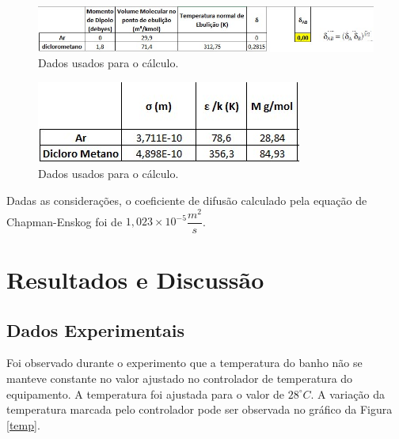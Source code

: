 \begin{figure}[H]
	\begin{center}
		\includegraphics[scale=0.8,trim={0 0 0 0}]{figuras/ladeq/difusao/tab1}
		\caption{Dados usados para o cálculo.}
		\label{tab1}
	\end{center}
\end{figure}


\begin{figure}[H]
	\begin{center}
		\includegraphics[scale=0.8,trim={0 0 0 0}]{figuras/ladeq/difusao/tab2}
		\caption{Dados usados para o cálculo.}
		\label{tab2}
	\end{center}
\end{figure}


Dadas as considerações, o coeficiente de difusão calculado pela equação de Chapman-Enskog foi de $1,023 \times 10^{-5}  \dfrac{m^{2}}{s}$.

\chapter{Resultados e Discussão}

\section{Dados Experimentais}

Foi observado durante o experimento que a temperatura do banho não se manteve constante no valor ajustado no controlador de temperatura do equipamento. A temperatura foi ajustada para o valor de $28^{\circ} C$. A variação da temperatura marcada pelo controlador pode ser observada no gráfico da Figura \ref{temp}.


